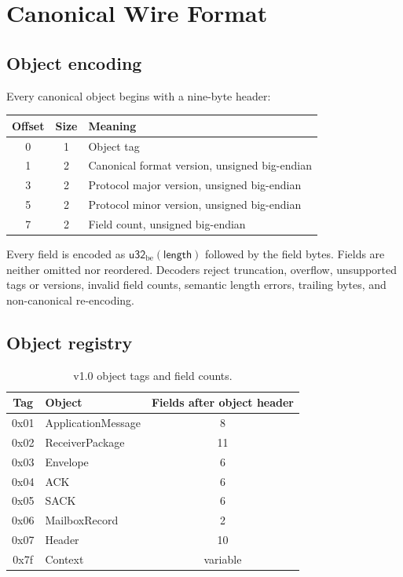 \documentclass[11pt,letterpaper]{article}
\begin{document}
\section{Canonical Wire Format}
\label{sec:wire}

\subsection{Object encoding}

Every canonical object begins with a nine-byte header:
\begin{center}
\begin{tabular}{ccl}
\toprule
Offset & Size & Meaning \\
\midrule
0 & 1 & Object tag \\
1 & 2 & Canonical format version, unsigned big-endian \\
3 & 2 & Protocol major version, unsigned big-endian \\
5 & 2 & Protocol minor version, unsigned big-endian \\
7 & 2 & Field count, unsigned big-endian \\
\bottomrule
\end{tabular}
\end{center}

Every field is encoded as $\mathsf{u32}_{\mathrm{be}}(\mathsf{length})$ followed by the
field bytes. Fields are neither omitted nor reordered. Decoders reject truncation,
overflow, unsupported tags or versions, invalid field counts, semantic length errors,
trailing bytes, and non-canonical re-encoding.

\subsection{Object registry}

\begin{table}[ht]
\centering
\caption{v1.0 object tags and field counts.}
\label{tab:objects}
\begin{tabular}{clc}
\toprule
Tag & Object & Fields after object header \\
\midrule
0x01 & ApplicationMessage & 8 \\
0x02 & ReceiverPackage & 11 \\
0x03 & Envelope & 6 \\
0x04 & ACK & 6 \\
0x05 & SACK & 6 \\
0x06 & MailboxRecord & 2 \\
0x07 & Header & 10 \\
0x7f & Context & variable \\
\bottomrule
\end{tabular}
\end{table}
\end{document}
